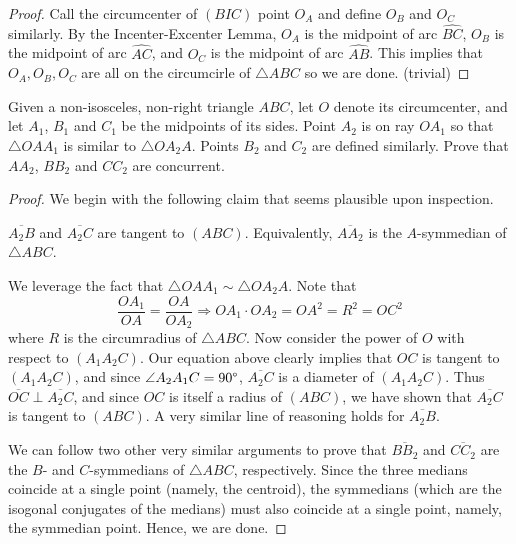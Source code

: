 \documentclass[letterpaper,oneside]{scrartcl}
\providecommand{\ol}{\overline}
\begin{document}
\begin{proof}
  Call the circumcenter of $(BIC)$ point $O_A$ and define $O_B$ and $O_C$ similarly. By the Incenter-Excenter Lemma, $O_A$ is the midpoint of arc \(\widehat{BC}\), $O_B$ is the midpoint of arc \(\widehat{AC}\), and $O_C$ is the midpoint of arc \(\widehat{AB}\). This implies that \(O_A, O_B, O_C\) are all on the circumcirle of \(\triangle ABC\) so we are done. (trivial)
\end{proof}
\begin{problem*}
  [4.43, USAMO 1995/3]
  Given a non-isosceles, non-right triangle $ABC$, let $O$ denote its circumcenter, and let $A_1$, $B_1$ and $C_1$ be the midpoints of its sides. Point $A_2$ is on ray $OA_1$ so that $\triangle OAA_1$ is similar to $\triangle OA_2A$. Points $B_2$ and $C_2$ are defined similarly. Prove that $AA_2$, $BB_2$ and $CC_2$ are concurrent.
\end{problem*}
\begin{proof}
  We begin with the following claim that seems plausible upon inspection.
  \begin{claim*}
    \(\ol{A_2B}\) and \(\ol{A_2C}\) are tangent to \((ABC)\). Equivalently, \(\ol{AA_2}\) is the $A$-symmedian of \(\triangle ABC\).
  \end{claim*}
  \begin{subproof}
    We leverage the fact that \(\triangle OAA_1 \sim \triangle OA_2A\). Note that 
    \[\frac{OA_1}{OA} = \frac{OA}{OA_2} \Rightarrow OA_1 \cdot OA_2 = {OA}^2 = R^2 = {OC}^2\]
    where $R$ is the circumradius of \(\triangle ABC\).
    Now consider the power of \(O\) with respect to \((A_1A_2C)\). Our equation above clearly implies that \(OC\) is tangent to \((A_1A_2C)\), and since \(\angle A_2A_1C = 90\degree\), \(\ol{A_2C}\) is a diameter of \((A_1A_2C)\). Thus \(\ol{OC} \perp \ol{A_2C}\), and since \(OC\) is itself a radius of \((ABC)\), we have shown that \(\ol{A_2C}\) is tangent to \((ABC)\). A very similar line of reasoning holds for \(\ol{A_2B}\).
  \end{subproof}
  We can follow two other very similar arguments to prove that \(\ol{BB_2}\) and \(\ol{CC_2}\) are the $B$- and $C$-symmedians of \(\triangle ABC\), respectively. Since the three medians coincide at a single point (namely, the centroid), the symmedians (which are the isogonal conjugates of the medians) must also coincide at a single point, namely, the symmedian point. Hence, we are done.
\end{proof}
\end{document}
